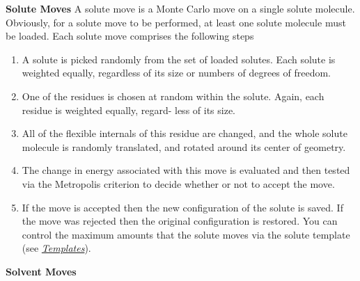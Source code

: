 \documentclass[letterpaper,10pt,english]{sphinxmanual}
\begin{document}
\textbf{Solute Moves}
A solute move is a Monte Carlo move on a single solute molecule. Obviously, for a solute move to be performed, at least one solute molecule must be loaded. Each solute move comprises the following steps
\begin{enumerate}
\item {} 
A solute is picked randomly from the set of loaded solutes. Each solute is weighted equally, regardless of its size or numbers of degrees of freedom.

\item {} 
One of the residues is chosen at random within the solute. Again, each residue is weighted equally, regard- less of its size.

\item {} 
All of the flexible internals of this residue are changed, and the whole solute molecule is randomly translated, and rotated around its center of geometry.

\item {} 
The change in energy associated with this move is evaluated and then tested via the Metropolis criterion to decide whether or not to accept the move.

\item {} 
If the move is accepted then the new configuration of the solute is saved. If the move was rejected then the original configuration is restored. You can control the maximum amounts that the solute moves via the solute template (see {\hyperref[protoms:temref]{\emph{Templates}}}).

\end{enumerate}

\textbf{Solvent Moves}
\end{document}
